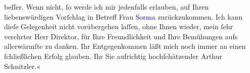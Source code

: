                beſſer. Wenn nicht, ſo werde ich mir jedenfalls erlauben, auf Ihren liebenswürdigen
               Vorſchlag in Betreff Frau \textcolor{blue}{Sorma}{}\ledrightnote{\textcolor{blue}{Agnes Sorma}} zurückzukommen.
               Ich kann dieſe Gelegenheit nicht vorübergehen laſſen, ohne Ihnen wieder, mein ſehr
               verehrter Herr Direktor, für Ihre Freundlichkeit und Ihre Bemühungen aufs
               allerwärmſte zu danken. Ihr Entgegenkommen läßt mich noch immer an einen
               ſchließlichen Erfolg glauben. Ihr Sie aufrichtig hochſchätzender Arthur
               Schnitzler.«\pend
           \endnumbering{}  
      